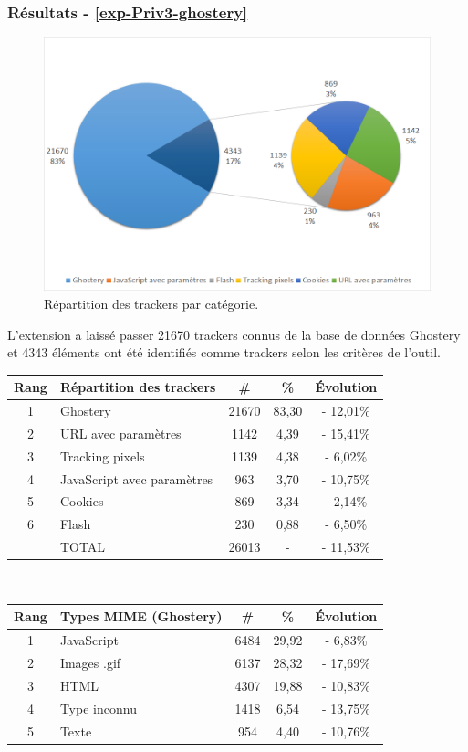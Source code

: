 \subsubsection{Résultats - \autoref{exp-Priv3-ghostery}}
\begin{figure}[!h]
	\centering
	\includegraphics[scale=.6]{resultats/ANALYSES/Images/Priv3-Ghostery.png}
	\caption{\label{exp-Priv3-ghostery}Répartition des trackers par catégorie.}
\end{figure}

L'extension a laissé passer 21670 trackers connus de la base de données Ghostery et 4343 éléments ont été identifiés comme trackers selon les critères de l'outil.\\

\begin{tabular}{ c | p{5cm} | c | c || c | }
   Rang & Répartition des trackers & \# & \% & Évolution \\
   \hline
   \hline
   1 & Ghostery & 21670 & 83,30 & - 12,01\% \\
   2 & URL avec paramètres & 1142 & 4,39 & - 15,41\% \\
   3 & Tracking pixels & 1139 & 4,38 & - 6,02\% \\
   4 & JavaScript avec paramètres & 963 & 3,70 & - 10,75\% \\
   5 & Cookies & 869 & 3,34 & - 2,14\% \\
   6 & Flash & 230 & 0,88 & - 6,50\% \\
   \hline
    & TOTAL & 26013 & - & - 11,53\%\\
   \hline
\end{tabular}
\\[1cm]

\begin{tabular}{ c | p{5cm} | c | c | c | }
   Rang & Types MIME (Ghostery) & \# & \% & Évolution\\
   \hline
   \hline
   1 & JavaScript & 6484 & 29,92 & - 6,83\% \\
   2 & Images .gif & 6137 & 28,32 & - 17,69\% \\
   3 & HTML & 4307 & 19,88 & - 10,83\% \\
   4 & Type inconnu & 1418 & 6,54 & - 13,75\% \\
   5 & Texte & 954 & 4,40 & - 10,76\% \\
   \hline
\end{tabular}
\\[.3cm]

